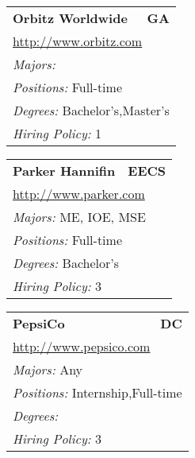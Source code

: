\documentclass[twoside]{article}
\begin{document}
\begin{center}
\begin{multicols}{3}
\begin{FlushLeft}
\begin{minipage}{\columnwidth}
\end{minipage}
 
\begin{minipage}{\columnwidth}\begin{tabularx}{.95\columnwidth}{Xr}
                 {\Large\bf Orbitz Worldwide} & {\Large\bf GA}\\
    \multicolumn{2}{p{.95\columnwidth}}{\url{http://www.orbitz.com}}\\
    \multicolumn{2}{p{.95\columnwidth}}{\emph{Majors:} }\\
    \multicolumn{2}{p{.95\columnwidth}}{\emph{Positions:} Full-time}\\
    \multicolumn{2}{p{.95\columnwidth}}{\emph{Degrees:} Bachelor's,Master's}\\
    \multicolumn{2}{p{.95\columnwidth}}{\emph{Hiring Policy:} 1}\\
    \end{tabularx}
    
\end{minipage}
 
\begin{minipage}{\columnwidth}\begin{tabularx}{.95\columnwidth}{Xr}
                 {\Large\bf Parker Hannifin} & {\Large\bf EECS}\\
    \multicolumn{2}{p{.95\columnwidth}}{\url{http://www.parker.com}}\\
    \multicolumn{2}{p{.95\columnwidth}}{\emph{Majors:} ME, IOE, MSE}\\
    \multicolumn{2}{p{.95\columnwidth}}{\emph{Positions:} Full-time}\\
    \multicolumn{2}{p{.95\columnwidth}}{\emph{Degrees:} Bachelor's}\\
    \multicolumn{2}{p{.95\columnwidth}}{\emph{Hiring Policy:} 3}\\
    \end{tabularx}
    
\end{minipage}
 
\begin{minipage}{\columnwidth}\begin{tabularx}{.95\columnwidth}{Xr}
                 {\Large\bf PepsiCo} & {\Large\bf DC}\\
    \multicolumn{2}{p{.95\columnwidth}}{\url{http://www.pepsico.com}}\\
    \multicolumn{2}{p{.95\columnwidth}}{\emph{Majors:} Any}\\
    \multicolumn{2}{p{.95\columnwidth}}{\emph{Positions:} Internship,Full-time}\\
    \multicolumn{2}{p{.95\columnwidth}}{\emph{Degrees:} }\\
    \multicolumn{2}{p{.95\columnwidth}}{\emph{Hiring Policy:} 3}\\
    \end{tabularx}
    

\end{minipage}
\end{FlushLeft}
\end{multicols}
\end{center}
\end{document}
